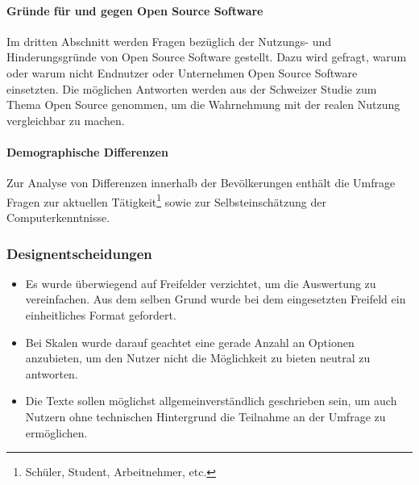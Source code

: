 \documentclass[a4paper]{article}
\begin{document}
    			\paragraph{Gründe für und gegen Open Source Software}
    				Im dritten Abschnitt werden Fragen bezüglich der Nutzungs- und Hinderungsgründe von Open Source Software gestellt. Dazu wird gefragt, warum oder warum nicht Endnutzer oder Unternehmen Open Source Software einsetzten. Die möglichen Antworten werden aus der Schweizer Studie zum Thema Open Source\cite{oss:studie} genommen, um die Wahrnehmung mit der realen Nutzung vergleichbar zu machen.
    			
    			\paragraph{Demographische Differenzen}
    				Zur Analyse von Differenzen innerhalb der Bevölkerungen enthält die Umfrage Fragen zur aktuellen Tätigkeit\footnote{Schüler, Student, Arbeitnehmer, etc.} sowie zur Selbsteinschätzung der Computerkenntnisse.
				
			\subsubsection{Designentscheidungen}
			 \begin{itemize}
			     \item Es wurde überwiegend auf Freifelder verzichtet, um die Auswertung zu vereinfachen. Aus dem selben Grund wurde bei dem eingesetzten Freifeld ein einheitliches Format gefordert.
				\item Bei Skalen wurde darauf geachtet eine gerade Anzahl an Optionen anzubieten, um den Nutzer nicht die Möglichkeit zu bieten neutral zu antworten.
				\item Die Texte sollen möglichst allgemeinverständlich geschrieben sein, um auch Nutzern ohne technischen Hintergrund die Teilnahme an der Umfrage zu ermöglichen.
			 \end{itemize}
			 
\end{document}
